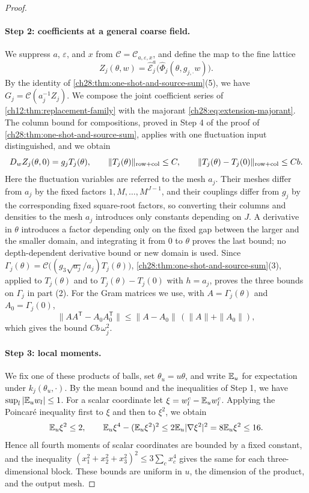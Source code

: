 \begin{proof}
\paragraph{Step 2: coefficients at a general coarse field.}
We suppress $a$, $\varepsilon$, and $x$ from $\mathscr C=\mathscr C_{a,\varepsilon,x}$, and define the map to the fine lattice
\begin{equation}\label{ch28:eq:joint-fine-output}
 Z_j(\theta,w)=\widehat{\mathcal E}_j^a\bigl(\widehat\Phi_j(\theta,g_{j,\cdot}w)\bigr).
\end{equation}
By the identity of \cref{ch28:thm:one-shot-and-source-sum}(5), we have $G_j=\mathscr C(a_j^{-1}Z_j)$. We compose the joint coefficient series of \cref{ch12:thm:replacement-family} with the majorant \eqref{ch28:eq:extension-majorant}. The column bound for compositions, proved in Step 4 of the proof of \cref{ch28:thm:one-shot-and-source-sum}, applies with one fluctuation input distinguished, and we obtain
\begin{equation}\label{ch28:eq:normalized-white-matrix}
 D_wZ_j(\theta,0)=g_jT_j(\theta),\qquad \|T_j(\theta)\|_{\rm row+col}\le C,\qquad \|T_j(\theta)-T_j(0)\|_{\rm row+col}\le Cb.
\end{equation}
Here the fluctuation variables are referred to the mesh $a_j$. Their meshes differ from $a_j$ by the fixed factors $1,M,\dots,M^{J-1}$, and their couplings differ from $g_j$ by the corresponding fixed square-root factors, so converting their columns and densities to the mesh $a_j$ introduces only constants depending on $J$. A derivative in $\theta$ introduces a factor depending only on the fixed gap between the larger and the smaller domain, and integrating it from $0$ to $\theta$ proves the last bound; no depth-dependent derivative bound or new domain is used. Since $\Gamma_j(\theta)=\mathscr C\bigl((g_3\sqrt{a_j}/a_j)T_j(\theta)\bigr)$, \cref{ch28:thm:one-shot-and-source-sum}(3), applied to $T_j(\theta)$ and to $T_j(\theta)-T_j(0)$ with $h=a_j$, proves the three bounds on $\Gamma_j$ in part (2). For the Gram matrices we use, with $A=\Gamma_j(\theta)$ and $A_0=\Gamma_j(0)$,
\[
 \|AA^{\mathsf T}-A_0A_0^{\mathsf T}\|\le\|A-A_0\|\,(\|A\|+\|A_0\|),
\]
which gives the bound $Cb\,\omega_j^2$.

\paragraph{Step 3: local moments.}
We fix one of these products of balls, set $\theta_u=u\theta$, and write $\mathbb E_u$ for expectation under $k_j(\theta_u,\cdot)$. By the mean bound and the inequalities of Step 1, we have $\sup_l|\mathbb E_uw_l|\le1$. For a scalar coordinate let $\xi=w_l^c-\mathbb E_uw_l^c$. Applying the Poincaré inequality first to $\xi$ and then to $\xi^2$, we obtain
\[
 \mathbb E_u\xi^2\le2,\qquad \mathbb E_u\xi^4-(\mathbb E_u\xi^2)^2\le2\mathbb E_u|\nabla\xi^2|^2=8\mathbb E_u\xi^2\le16.
\]
Hence all fourth moments of scalar coordinates are bounded by a fixed constant, and the inequality $(x_1^2+x_2^2+x_3^2)^2\le3\sum_cx_c^4$ gives the same for each three-dimensional block. These bounds are uniform in $u$, the dimension of the product, and the output mesh.


\end{proof}

